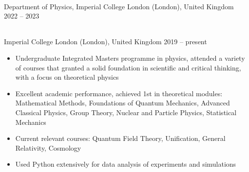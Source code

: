 \documentclass{res}[12pt] %
\begin{document}
\begin{resume}


\sectionRule
\vspace{6pt} %


\sectionRule
\vspace{6pt} %


 \\
Department of Physics, Imperial College London (London), United Kingdom \hfill 2022 -- 2023




\sectionRule
\vspace{6pt} %

 \\ 
Imperial College London (London), United Kingdom \hfill 2019 -- present

\begin{itemize} \itemsep -2pt
\item Undergraduate Integrated Masters programme in physics, attended a variety of courses that granted a solid foundation in scientific and critical thinking, with a focus on theoretical physics
\item Excellent academic performance, achieved 1st in theoretical modules: Mathematical Methods, Foundations of Quantum Mechanics, Advanced Classical Physics, Group Theory, Nuclear and Particle Physics, Statistical Mechanics
\item Current relevant courses: Quantum Field Theory, Unification, General Relativity, Cosmology
\item Used Python extensively for data analysis of experiments and simulations
\end{itemize}


\end{resume}
\end{document}
